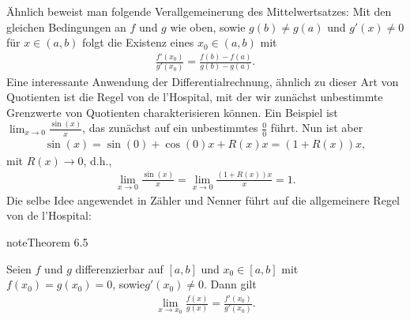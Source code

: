 \documentclass[letterpaper,10pt,english]{jupyterBook}
\begin{document}
Ähnlich beweist man folgende Verallgemeinerung des Mittelwertsatzes: Mit den gleichen Bedingungen an \(f\) und \(g\) wie oben, sowie \(g(b) \neq g(a)\) und \(g'(x) \neq 0\) für \(x \in (a,b)\) folgt die Existenz eines \(x_0 \in (a,b)\) mit
\begin{equation*}
\begin{split}\frac{f'(x_0)}{g'(x_0)} = \frac{f(b) - f(a)}{g(b) - g(a)}.\end{split}
\end{equation*}
Eine interessante Anwendung der Differentialrechnung, ähnlich zu dieser Art von Quotienten ist die Regel von de l’Hospital, mit der wir zunächst unbestimmte Grenzwerte von Quotienten charakterisieren können. Ein Beispiel ist\( \lim_{x \rightarrow 0} \frac{\sin(x)}x\), das zunächst auf ein unbestimmtes \(\frac{0}0\) führt. Nun ist aber
\begin{equation*}
\begin{split}\sin(x) = \sin(0) + \cos(0)x + R(x)x = (1+R(x))x,\end{split}
\end{equation*}
mit \(R(x) \rightarrow 0\), d.h.,
\begin{equation*}
\begin{split} \lim_{x \rightarrow 0} \frac{\sin(x)}x = \lim_{x \rightarrow 0} \frac{(1+R(x))x}x = 1.\end{split}
\end{equation*}
Die selbe Idee angewendet in Zähler und Nenner führt auf die allgemeinere Regel von de l’Hospital:
\label{differential/mws:theorem-2}
\begin{sphinxadmonition}{note}{Theorem 6.5}



Seien \(f\) und \(g\) differenzierbar auf \([a,b]\) und \(x_0 \in [a,b]\) mit \(f(x_0)=g(x_0) = 0\), sowie\(g'(x_0) \neq 0\). Dann gilt
\begin{equation*}
\begin{split} \lim_{x \rightarrow x_0} \frac{f(x)}{g(x)} = \frac{f'(x_0)}{g'(x_0)}.\end{split}
\end{equation*}\end{sphinxadmonition}
\end{document}

